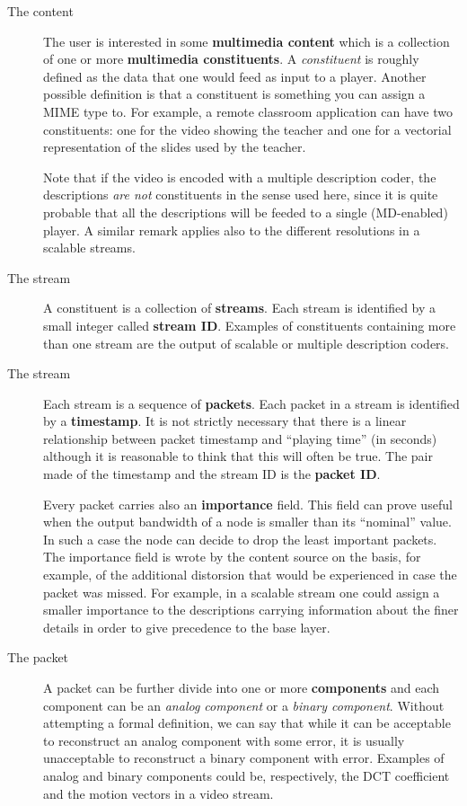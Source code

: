 \documentclass{medusabook}
\begin{document}
\begin{description}
  \item[The content] The user is interested in some \textbf{multimedia
content} which is a collection of one or more \textbf{multimedia
constituents}.  A \emph{constituent} is roughly defined as the data
that one would feed as input to a player. Another possible definition
is that a constituent is something you can assign a MIME type to. For
example, a remote classroom application can have two constituents: one
for the video showing the teacher and one for a vectorial
representation of the slides used by the teacher.

Note that if the video is encoded with a multiple description coder,
the descriptions \emph{are not} constituents in the sense used here,
since it is quite probable that all the descriptions will be feeded to
a single (MD-enabled) player.  A similar remark applies also to the
different resolutions in a scalable streams.
\item[The stream] A constituent is a collection of
  \textbf{streams}. Each stream is identified by a small
  integer called \textbf{stream ID}. Examples of constituents
  containing more than one stream are the output of scalable or
  multiple description coders.  
\item[The stream] Each stream is a sequence of \textbf{packets}. Each
  packet in a stream is identified by a \textbf{timestamp}.  It is not
  strictly necessary that there is a linear relationship between
  packet timestamp and ``playing time'' (in seconds) although it is
  reasonable to think that this will often be true.  The pair made of
  the timestamp and the stream ID is the \textbf{packet ID}.  

  Every packet carries also an \textbf{importance} field.  This field
  can prove useful when the output bandwidth of a node is smaller than
  its ``nominal'' value.  In such a case the node can decide to drop
  the least important packets.  The importance field is wrote by the
  content source on the basis, for example, of the additional
  distorsion that would be experienced in case the packet was missed.
  For example, in a scalable stream one could assign a smaller
  importance to the descriptions carrying information about the finer
  details in order to give precedence to the base layer.
\item[The packet] A packet can be further divide into one or more
  \textbf{components} and each component can be an \emph{analog
  component} or  a \emph{binary component}.  Without attempting a
  formal definition, we can say that while it can be acceptable to
  reconstruct an analog component with some error, it is usually
  unacceptable to reconstruct a binary component with error.  
  Examples of  analog and binary components could be, respectively,
  the DCT coefficient  and the motion vectors in a video stream.


\end{description}
\end{document}

